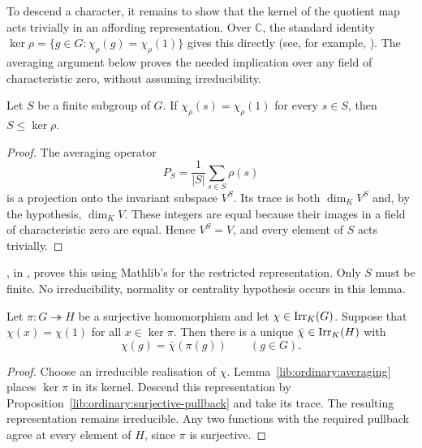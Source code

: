 To descend a character, it remains to show that the kernel of the quotient
map acts trivially in an affording representation. Over $\mathbb C$, the
standard identity
$\ker\rho=\{g\in G:\chi_\rho(g)=\chi_\rho(1)\}$ gives this directly
(see, for example, \cite[Lemma~2.19]{Isaacs1976}). The averaging argument below proves
the needed implication over any field of characteristic zero, without
assuming irreducibility.

\begin{lemma}
\label{lib:ordinary:averaging}
Let $S$ be a finite subgroup of $G$. If
$\chi_\rho(s)=\chi_\rho(1)$ for every $s\in S$, then $S\leq\ker\rho$.
\end{lemma}
\begin{proof}
The averaging operator
\[
 P_S=\frac1{|S|}\sum_{s\in S}\rho(s)
\]
is a projection onto the invariant subspace $V^S$. Its trace is both
$\dim_K V^S$ and, by the hypothesis, $\dim_K V$. These integers are equal
because their images in a field of characteristic zero are equal. Hence
$V^S=V$, and every element of $S$ acts trivially.
\end{proof}

\begin{implementation}
, in
, proves this using Mathlib's
 for the restricted
representation. Only $S$ must be finite. No irreducibility, normality or
centrality hypothesis occurs in this lemma.
\end{implementation}

\begin{theorem}
\label{lib:ordinary:character-descent}
Let $\pi:G\twoheadrightarrow H$ be a surjective homomorphism and let
$\chi\in\operatorname{Irr}_K(G)$. Suppose that $\chi(x)=\chi(1)$ for all
$x\in\ker \pi$. Then there is a unique $\bar\chi\in\operatorname{Irr}_K(H)$ with
\[
 \chi(g)=\bar\chi(\pi(g))\qquad(g\in G).
\]
\end{theorem}
\begin{proof}
Choose an irreducible realisation of $\chi$. Lemma~\ref{lib:ordinary:averaging}
places $\ker \pi$ in its kernel. Descend this representation by
Proposition~\ref{lib:ordinary:surjective-pullback} and take its trace.
The resulting representation remains irreducible. Any two functions with
the required pullback agree at every element of $H$, since $\pi$ is surjective.
\end{proof}

